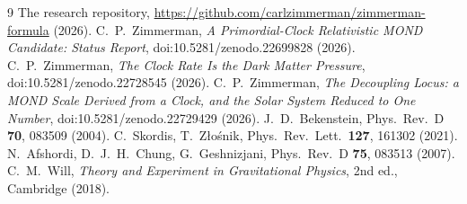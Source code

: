 \documentclass[11pt,letterpaper]{article}
\begin{document}
\begin{thebibliography}{9}
 The research repository, \url{https://github.com/carlzimmerman/zimmerman-formula} (2026).
 C.~P.~Zimmerman, \emph{A Primordial-Clock Relativistic MOND Candidate: Status Report}, doi:10.5281/zenodo.22699828 (2026).
 C.~P.~Zimmerman, \emph{The Clock Rate Is the Dark Matter Pressure}, doi:10.5281/zenodo.22728545 (2026).
 C.~P.~Zimmerman, \emph{The Decoupling Locus: a MOND Scale Derived from a Clock, and the Solar System Reduced to One Number}, doi:10.5281/zenodo.22729429 (2026).
 J.~D.~Bekenstein, Phys.\ Rev.\ D \textbf{70}, 083509 (2004).
 C.~Skordis, T.~Z\l{}o\'snik, Phys.\ Rev.\ Lett.\ \textbf{127}, 161302 (2021).
 N.~Afshordi, D.~J.~H.~Chung, G.~Geshnizjani, Phys.\ Rev.\ D \textbf{75}, 083513 (2007).
 C.~M.~Will, \emph{Theory and Experiment in Gravitational Physics}, 2nd ed., Cambridge (2018).
\end{thebibliography}
\end{document}
